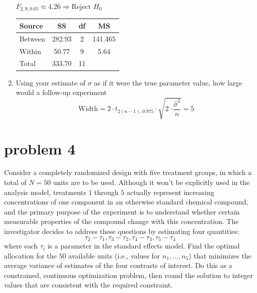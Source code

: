 \documentclass{article}
\begin{document}
\begin{enumerate}
	      \( F_{2,9,0.05} \approx 4.26 \Rightarrow \text{Reject } H_0 \)
	      \vspace{1em}
	      \begin{center}
		      \begin{tabular}{lccc}
			      \toprule
			      Source  & SS     & df & MS      \\
			      \midrule
			      Between & 282.93 & 2  & 141.465 \\
			      Within  & 50.77  & 9  & 5.64    \\
			      Total   & 333.70 & 11 &         \\
			      \bottomrule
		      \end{tabular}
	      \end{center}
	\item Using your estimate of $\sigma$ as if it were the true parameter value, how large would a follow-up experiment
	      \[
		      \text{Width} = 2 \cdot t_{2(n - 1), 0.975} \cdot \sqrt{2 \cdot \frac{\hat{\sigma}^2}{n}} = 5
	      \]
\end{enumerate}


\section{problem 4}
Consider a completely randomized design with five treatment groups, in which a total of $N = 50$
units are to be used. Although it won’t be explicitly used in the analysis model, treatments $1$
through $5$ actually represent increasing concentrations of one component in an otherwise standard
chemical compound, and the primary purpose of the experiment is to understand whether certain
measurable properties of the compound change with this concentration. The investigator decides
to address these questions by estimating four quantities:
$$
	\tau_2 - \tau_1,\tau_3-\tau_2,\tau_4-\tau_3,\tau_5-\tau_4
$$
where each $\tau_i$ is a parameter in the standard effects model. Find the optimal allocation for the $50$
available units (i.e., values for $n_1,\ldots , n_5$) that minimizes the average variance of estimates of the
four contrasts of interest. Do this as a constrained, continuous optimization problem, then round
the solution to integer values that are consistent with the required constraint.
\end{document}
